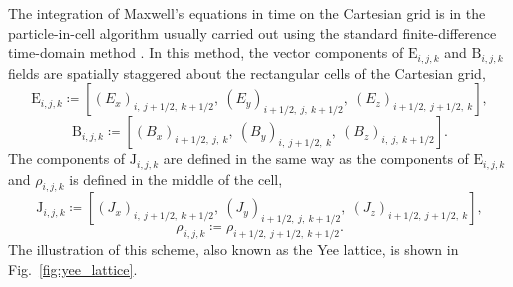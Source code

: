 \documentclass[10pt, a4paper, twoside, openright]{report}
\renewcommand{\vec}[1]{\boldsymbol{\mathrm{#1}}}
\begin{document}
The integration of Maxwell's equations in time on the Cartesian grid is in the particle-in-cell algorithm usually carried out using the standard finite-difference time-domain method \cite{Yee1966}. In this method, the vector components of $ \vec{E}_{i, j, k} $ and $ \vec{B}_{i, j, k} $ fields are spatially staggered about the rectangular cells of the Cartesian grid,
\begin{equation}
	\label{eq:staggered_E}
	\vec{E}_{i, j, k} \coloneqq \left[\left(E_{x}\right)_{i,\: j + 1/2,\: k + 1/2}, \ \left(E_{y}\right)_{i + 1/2,\: j,\: k + 1/2}, \ \left(E_{z}\right)_{i + 1/2,\: j + 1/2,\: k} \right],
\end{equation}
\begin{equation}
	\label{eq:staggered_B}
	\vec{B}_{i, j, k} \coloneqq \left[\left(B_{x}\right)_{i + 1/2,\: j,\: k}, \ \left(B_{y}\right)_{i,\: j + 1/2,\: k}, \ \left(B_{z}\right)_{i,\: j,\: k + 1/2} \right].
\end{equation}
The components of $ \vec{J}_{i, j, k} $ are defined in the same way as the components of $ \vec{E}_{i, j, k} $ and $ \rho_{i, j, k} $ is defined in the middle of the cell,
\begin{equation}\label{eq:staggered_J}
	\vec{J}_{i, j, k} \coloneqq \left[\left(J_{x}\right)_{i,\: j + 1/2,\: k + 1/2}, \ \left(J_{y}\right)_{i + 1/2,\: j,\: k + 1/2}, \ \left(J_{z}\right)_{i + 1/2,\: j + 1/2,\: k} \right],
\end{equation}
\begin{equation}\label{eq:staggered_rho}
	\rho_{i, j, k} \coloneqq \rho_{i + 1/2,\: j + 1/2,\: k + 1/2}.
\end{equation}
The illustration of this scheme, also known as the Yee lattice, is shown in Fig.~\ref{fig:yee_lattice}. 
\end{document}
